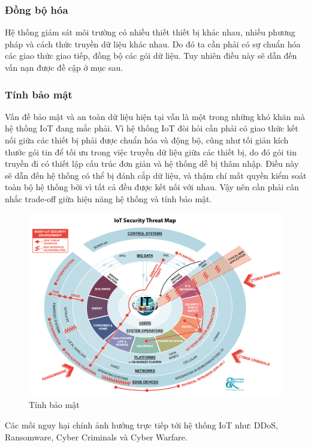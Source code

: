 \subsubsection*{Đồng bộ hóa} Hệ thống giám sát môi trường có nhiều thiết thiết bị khác nhau, nhiều phương pháp và cách thức truyền dữ liệu khác nhau. Do đó ta cần phải có sự chuẩn hóa các giao thức giao tiếp, đồng bộ các gói dữ liệu. Tuy nhiên điều này sẽ dẫn đến vấn nạn được đề cập ở mục sau.

\subsubsection*{Tính bảo mật} Vấn đề bảo mật và an toàn dữ liệu hiện tại vẫn là một trong những khó khăn mà hệ thống IoT đang mắc phải. Vì hệ thống IoT đòi hỏi cần phải có giao thức kết nối giữa các thiết bị phải được chuẩn hóa và động bộ, cũng như tối giản kích thước gói tin để tối ưu trong việc truyền dữ liệu giữa các thiết bị, do đó gói tin truyền đi có thiết lập cấu trúc đơn giản và hệ thống dễ bị thâm nhập. Điều này sẽ dẫn đến hệ thống có thể bị đánh cắp dữ liệu, và thậm chí mất quyền kiểm soát toàn bộ hệ thống bởi vì tất cả đều được kết nối với nhau. Vậy nên cần phải cân nhắc trade-off giữa hiệu năng hệ thống và tính bảo mật.
\begin{figure}[H]
\centering    
\includegraphics[width=5in]{virusiot}
\caption[Tính bảo mật]{Tính bảo mật}
\label{fig:virusiot}
\end{figure}

Các mối nguy hại chính ảnh hưởng trực tiếp tới hệ thống IoT như: DDoS, Ransomware, Cyber Criminals và Cyber Warfare. 



